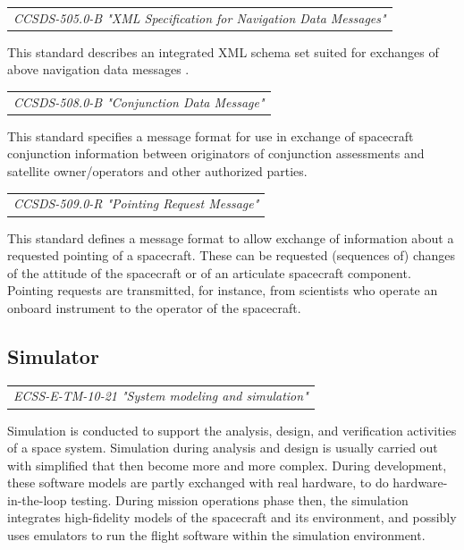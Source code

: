\begin{tabular}{l}
\textit{CCSDS-505.0-B "XML Specification for Navigation Data Messages" \cite{CCSDS-505.0-B}} \\
\end{tabular}

This standard describes an integrated XML schema set suited for exchanges of above navigation data messages . 

\begin{tabular}{l}
\textit{CCSDS-508.0-B "Conjunction Data Message" \cite{CCSDS-508.0-B}} \\
\end{tabular}

This standard specifies a message format for use in exchange of spacecraft conjunction information between originators of conjunction assessments and satellite owner/operators and other authorized parties. 

\begin{tabular}{l}
\textit{CCSDS-509.0-R "Pointing Request Message" \cite{CCSDS-509.0-R}} \\
\end{tabular}

This standard defines a message format to allow exchange of information about a requested pointing of a spacecraft. These can be requested (sequences of) changes of the attitude of the spacecraft or of an articulate spacecraft component. Pointing requests are transmitted, for instance, from scientists who operate an onboard instrument to the operator of the  spacecraft.
  
\subsection{Simulator}

\begin{tabular}{l}
\textit{ECSS-E-TM-10-21 "System modeling and simulation" \cite{ECSS-E-TM-10-21}} \\
\end{tabular}

Simulation is conducted to support the analysis, design, and verification activities of a space system. Simulation during analysis and design is usually carried out with simplified that then become more and more complex. During development, these software models are partly exchanged with real hardware, to do hardware-in-the-loop testing. During mission operations phase then, the simulation integrates high-fidelity models of the spacecraft and its environment, and possibly uses emulators to run the flight software within the simulation environment.

